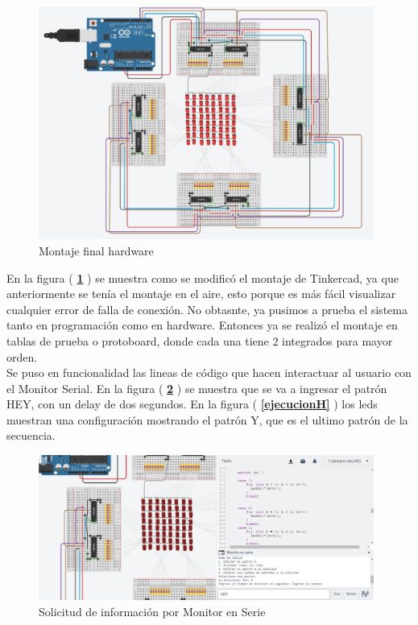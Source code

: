 \documentclass{article}
\begin{document}
    \begin{figure}[h]
    \includegraphics[width=11cm]{FullMontaje.jpeg}
    \centering
    \caption{Montaje final hardware}
    \label{circuito}
    \end{figure}
    
En la figura ( \textbf{\ref{circuito}} ) se muestra como se modificó el montaje de Tinkercad, ya que anteriormente se tenía el montaje en el aire, esto porque es más fácil visualizar cualquier error de falla de conexión. No obtasnte, ya pusimos a prueba el sistema tanto en programación como en hardware. Entonces ya se realizó el montaje en tablas de prueba o protoboard, donde cada una tiene 2 integrados para mayor orden.\\

Se puso en funcionalidad las lineas de código que hacen interactuar al usuario con el Monitor Serial. En la figura ( \textbf{\ref{solicitud}} ) se muestra que se va a ingresar el patrón HEY, con un delay de dos segundos. En la figura ( \textbf{\ref{ejecucionH}} ) los leds muestran una configuración mostrando el patrón Y, que es el ultimo patrón de la secuencia.\\

   \begin{figure}[h]
    \includegraphics[width=11cm]{montaje6.jpeg}
    \centering
    \caption{Solicitud de información por Monitor en Serie}
    \label{solicitud}
    \end{figure}
    
\end{document}
